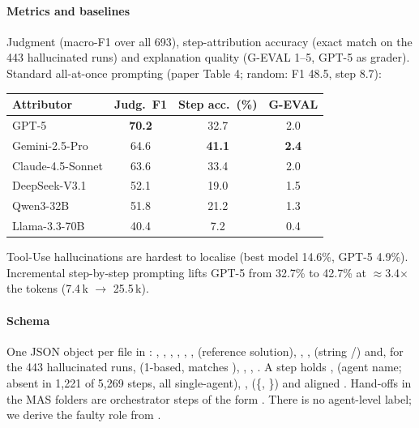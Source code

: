 \paragraph{Metrics and baselines} Judgment (macro-F1 over all 693), step-attribution accuracy (exact match on the 443 hallucinated runs) and explanation quality (G-EVAL 1--5, GPT-5 as grader). Standard all-at-once prompting (paper Table 4; random: F1 48.5, step 8.7):

\begin{center}\small
\begin{tabular}{@{}lccc@{}}\toprule
Attributor & Judg.\ F1 & Step acc.\ (\%) & G-EVAL\\\midrule
GPT-5 & \textbf{70.2} & 32.7 & 2.0\\
Gemini-2.5-Pro & 64.6 & \textbf{41.1} & \textbf{2.4}\\
Claude-4.5-Sonnet & 63.6 & 33.4 & 2.0\\
DeepSeek-V3.1 & 52.1 & 19.0 & 1.5\\
Qwen3-32B & 51.8 & 21.2 & 1.3\\
Llama-3.3-70B & 40.4 & 7.2 & 0.4\\\bottomrule
\end{tabular}
\end{center}
Tool-Use hallucinations are hardest to localise (best model 14.6\%, GPT-5 4.9\%). Incremental step-by-step prompting lifts GPT-5 from 32.7\% to 42.7\% at $\approx$3.4$\times$ the tokens (7.4\,k $\to$ 25.5\,k).

\paragraph{Schema} One JSON object per file in : , , , , , ,  (reference solution), , ,  (string /) and, for the 443 hallucinated runs,  (1-based, matches ), , , . A step holds ,  (agent name; absent in 1,221 of 5,269 steps, all single-agent), ,  (\{, \}) and aligned . Hand-offs in the MAS folders are orchestrator steps of the form . There is no agent-level label; we derive the faulty role from .

